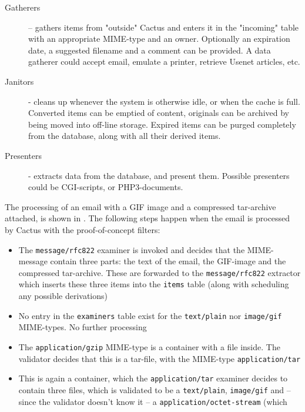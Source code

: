 \begin{description}
\item[Gatherers] -- gathers items from "outside" Cactus and
  enters it in the "incoming" table with an appropriate
  MIME-type and an owner.  Optionally an expiration date, a
  suggested filename and a comment can be provided. A
  data gatherer could accept email, emulate a printer, retrieve
  Usenet articles, etc.
  
\item[Janitors] - cleans up whenever the system is otherwise
  idle, or when the cache is full.  Converted items can be
  emptied of content, originals can be archived by being
  moved into off-line storage.  Expired items can be purged
  completely from the database, along with all their derived
  items.
  
\item[Presenters] - extracts data from the database, and
  present them.  Possible presenters could be CGI-scripts,
  or  PHP3-documents.  
  
\end{description}


The processing of an email with a GIF image and a compressed
tar-archive attached, is shown in .  The
following steps happen when the email is processed by Cactus with the
proof-of-concept filters:

\begin{itemize}
\item The \texttt{message/rfc822} examiner is invoked and decides that
  the MIME-message contain three parts:  the text of the email, the
  GIF-image and the compressed tar-archive.  These are forwarded to
  the \texttt{message/rfc822} extractor which inserts these three
  items into the \texttt{items} table (along with scheduling any
  possible derivations)
\item No entry in the \texttt{examiners} table exist for the
  \texttt{text/plain} nor \texttt{image/gif} MIME-types.  No further
  processing 
\item The \texttt{application/gzip} MIME-type is a container with a
  file inside.  The validator decides that this is a tar-file, with
  the MIME-type \texttt{application/tar}
\item This is again a container, which the \texttt{application/tar}
  examiner decides to contain three files, which is validated to be a
  \texttt{text/plain}, \texttt{image/gif} and -- since the validator
  doesn't know it -- a \texttt{application/octet-stream} (which 
\end{itemize}



